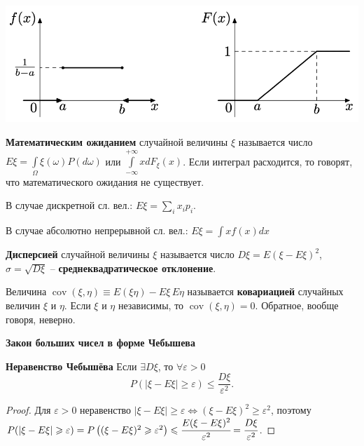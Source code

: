 \includegraphics[width=\columnwidth]{pics/abs.png}


\textbf{Математическим ожиданием} случайной величины $\xi$ называется число $E\xi = \int\limits_{\Omega} \xi(\omega) P(d\omega)$ или $\int\limits_{-\infty}^{+\infty} x dF_{\xi}(x)$.
Если интеграл расходится, то говорят, что математического ожидания не существует.

В случае дискретной сл. вел.: $E\xi = \displaystyle\sum_{i} x_i p_i$.

В случае абсолютно непрерывной сл. вел.: $E\xi = \int x f(x) dx$

\textbf{Дисперсией} случайной величины $\xi$ называется число $D\xi = E(\xi - E\xi)^2$, $\sigma = \sqrt{D \xi}$ -- \textbf{среднеквадратическое отклонение}.

Величина $\operatorname{cov}(\xi, \eta) \equiv E (\xi \eta)-E \xi \, E \eta$ называется \textbf{ковариацией} случайных величин $\xi$ и $\eta$. Если $\xi$ и $\eta$ независимы, то $\operatorname{cov}(\xi, \eta) = 0$. Обратное, вообще говоря, неверно.


\centerline{\textbf{Закон больших чисел в форме Чебышева}}

\textbf{Неравенство Чебышёва}
Если $\exists D\xi$, то $\forall \varepsilon > 0$
\begin{equation*}
    P(|\xi-E \xi| \geqslant \varepsilon) \leqslant \frac{D \xi}{\varepsilon^{2}}.
\end{equation*}


\begin{proof}
    Для $\varepsilon > 0$ неравенство $|\xi - E \xi| \geqslant \varepsilon \iff (\xi - E \xi)^2 \geqslant \varepsilon^2$, поэтому $P(|\xi-E \xi| \geqslant \varepsilon) = 
        P\left((\xi-E \xi)^{2} \geqslant \varepsilon^{2}\right) \leqslant 
        \cfrac{E (\xi-E \xi)^{2}}{\varepsilon^{2}} =
        \cfrac{D \xi}{\varepsilon^{2}}$.
\end{proof}

